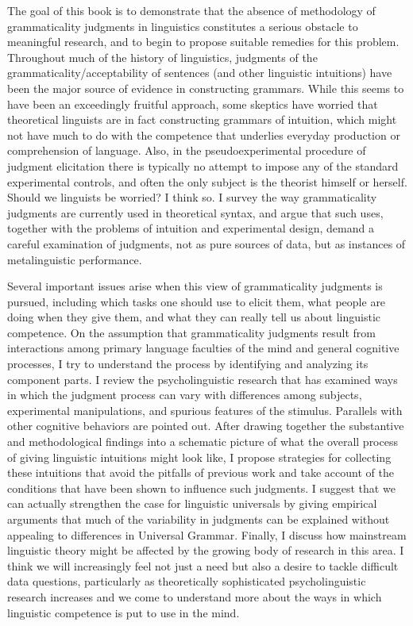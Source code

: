 
The goal of this book is to demonstrate that the absence of methodology of grammaticality judgments in linguistics constitutes a serious obstacle to meaningful research, and to begin to propose suitable remedies for this problem. Throughout much of the history of linguistics, judgments of the grammaticality/acceptability of sentences (and other linguistic intuitions) have been the major source of evidence in constructing grammars. While this seems to have been an exceedingly fruitful approach, some skeptics have worried that theoretical linguists are in fact constructing grammars of intuition, which might not have much to do with the competence that underlies everyday production or comprehension of language. Also, in the pseudoexperimental procedure of judgment elicitation there is typically no attempt to impose any of the standard experimental controls, and often the only subject is the theorist himself or herself. Should we linguists be worried? I think so. I survey the way grammaticality judgments are currently used in theoretical syntax, and argue that such uses, together with the problems of intuition and experimental design, demand a careful examination of judgments, not as pure sources of data, but as instances of metalinguistic performance.

Several important issues arise when this view of grammaticality judgments is pursued, including which tasks one should use to elicit them, what people are doing when they give them, and what they can really tell us about linguistic competence. On the assumption that grammaticality judgments result from interactions among primary language faculties of the mind and general cognitive processes, I try to understand the process by identifying and analyzing its component parts. I review the psycholinguistic research that has examined ways in which the judgment process can vary with differences among subjects, experimental manipulations, and spurious features of the stimulus. Parallels with other cognitive behaviors are pointed out. After drawing together the substantive and methodological findings into a schematic picture of what the overall process of giving linguistic intuitions might look like, I propose strategies for collecting these intuitions that avoid the pitfalls of previous work and take account of the conditions that have been shown to influence such judgments. I suggest that we can actually strengthen the case for linguistic universals by giving empirical arguments that much of the variability in judgments can be explained without appealing to differences in Universal Grammar. Finally, I discuss how mainstream linguistic theory might be affected by the growing body of research in this area. I think we will increasingly feel not just a need but also a desire to tackle difficult data questions, particularly as theoretically sophisticated psycholinguistic research increases and we come to understand more about the ways in which linguistic competence is put to use in the mind.